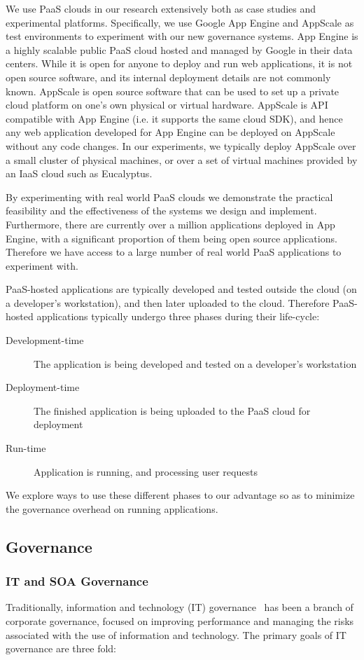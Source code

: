 We use PaaS clouds in our research extensively both as case studies
and experimental platforms. Specifically, we use Google App Engine and AppScale as test environments
to experiment with our new governance systems. App Engine is a highly scalable public PaaS cloud hosted and
managed by Google in their data centers. While it is open for anyone to deploy and run web applications, it is not
open source software, and its internal deployment details are not commonly known. AppScale is open source
software that can be used to set up a private cloud platform on one's own physical or virtual hardware. AppScale
is API compatible with App Engine (i.e. it supports the same cloud SDK), and hence any web application developed
for App Engine can be deployed on AppScale without any code changes. In our experiments, we typically deploy
AppScale over a small cluster of physical machines, or over a set of virtual machines provided by an IaaS cloud
such as Eucalyptus.

By experimenting with real world PaaS clouds we demonstrate the practical feasibility and the effectiveness of 
the systems we design and implement. Furthermore, there are currently over a million applications deployed
in App Engine, with a significant proportion of them being open source applications. Therefore we have access
to a large number of real world PaaS applications to experiment with.

PaaS-hosted applications are typically developed and tested outside the cloud (on a developer's workstation), 
and then later uploaded to the cloud. Therefore PaaS-hosted applications typically undergo three phases 
during their life-cycle:
\begin{description}
\item[Development-time] The application is being developed and tested on a developer's workstation
\item[Deployment-time] The finished application is being uploaded to the PaaS cloud for deployment
\item[Run-time] Application is running, and processing user requests
\end{description}
We explore ways to use these different phases to our advantage so as to minimize the governance
overhead on running applications. 

\subsection{Governance}
\subsubsection{IT and SOA Governance}
Traditionally, information and technology (IT) governance~\cite{brown2005framing} has been a branch of 
corporate governance, focused on
improving performance and managing the risks associated with the use of information and technology. The primary
goals of IT governance are three fold:

